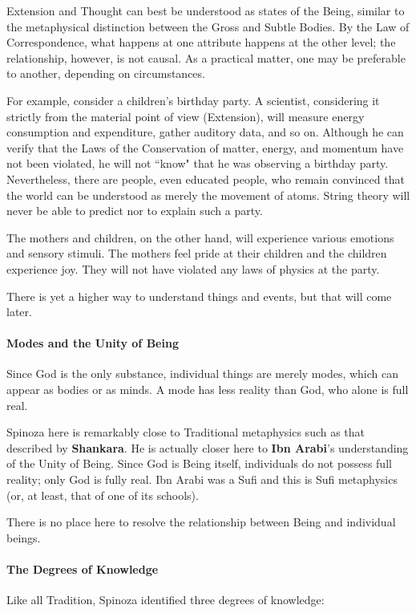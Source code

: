 Extension and Thought can best be understood as states of the Being, similar to the metaphysical distinction between the Gross and Subtle Bodies. By the Law of Correspondence, what happens at one attribute happens at the other level; the relationship, however, is not causal. As a practical matter, one may be preferable to another, depending on circumstances.

For example, consider a children's birthday party. A scientist, considering it strictly from the material point of view (Extension), will measure energy consumption and expenditure, gather auditory data, and so on. Although he can verify that the Laws of the Conservation of matter, energy, and momentum have not been violated, he will not ``know" that he was observing a birthday party. Nevertheless, there are people, even educated people, who remain convinced that the world can be understood as merely the movement of atoms. String theory will never be able to predict nor to explain such a party.

The mothers and children, on the other hand, will experience various emotions and sensory stimuli. The mothers feel pride at their children and the children experience joy. They will not have violated any laws of physics at the party.

There is yet a higher way to understand things and events, but that will come later.

\paragraph{Modes and the Unity of Being}
Since God is the only substance, individual things are merely modes, which can appear as bodies or as minds. A mode has less reality than God, who alone is full real.

Spinoza here is remarkably close to Traditional metaphysics such as that described by \textbf{Shankara}. He is actually closer here to \textbf{Ibn Arabi}'s understanding of the Unity of Being. Since God is Being itself, individuals do not possess full reality; only God is fully real. Ibn Arabi was a Sufi and this is Sufi metaphysics (or, at least, that of one of its schools).

There is no place here to resolve the relationship between Being and individual beings.

\paragraph{The Degrees of Knowledge}
Like all Tradition, Spinoza identified three degrees of knowledge:

